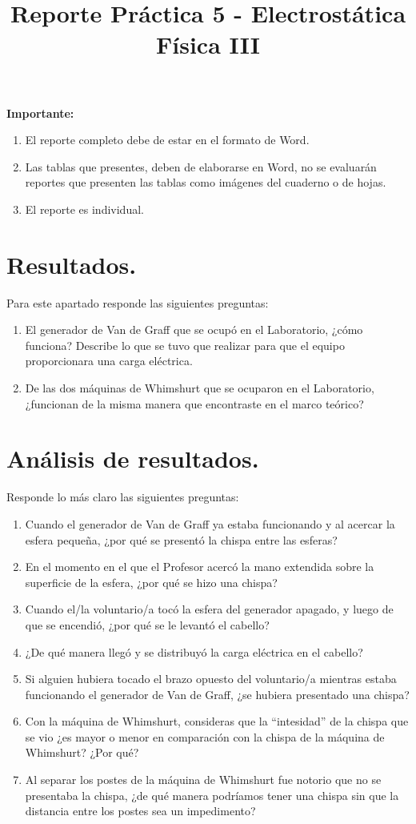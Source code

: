 \documentclass[14pt]{extarticle}
\title{\vspace*{-2cm} Reporte Práctica 5 - Electrostática \\  Física III\vspace{-5ex}}
\date{}
\begin{document}
\maketitle

\textbf{Importante:}
\begin{enumerate}
\item El reporte completo debe de estar en el formato de Word.
\item Las tablas que presentes, deben de elaborarse en Word, no se evaluarán reportes que presenten las tablas como imágenes del cuaderno o de hojas.
\item El reporte es individual.
\end{enumerate}

\section{Resultados.}

Para este apartado responde las siguientes preguntas:
\begin{enumerate}[label=\roman*)]
\item El generador de Van de Graff que se ocupó en el Laboratorio, ¿cómo funciona? Describe lo que se tuvo que realizar para que el equipo proporcionara una carga eléctrica.
\item De las dos máquinas de Whimshurt que se ocuparon en el Laboratorio, ¿funcionan de la misma manera que encontraste en el marco teórico?
\end{enumerate}

\section{Análisis de resultados.}

Responde lo más claro las siguientes preguntas:
\begin{enumerate}[label=\alph*)]
\item Cuando el generador de Van de Graff ya estaba funcionando y al acercar la esfera pequeña, ¿por qué se presentó la chispa entre las esferas?
\item En el momento en el que el Profesor acercó la mano extendida sobre la superficie de la esfera, ¿por qué se hizo una chispa?
\item Cuando el/la voluntario/a tocó la esfera del generador apagado, y luego de que se encendió, ¿por qué se le levantó el cabello?
\item ¿De qué manera llegó y se distribuyó la carga eléctrica en el cabello?
\item Si alguien hubiera tocado el brazo opuesto del voluntario/a mientras estaba funcionando el generador de Van de Graff, ¿se hubiera presentado una chispa?
\item Con la máquina de Whimshurt, consideras que la \enquote{intesidad} de la chispa que se vio ¿es mayor o menor en comparación con la chispa de la máquina de Whimshurt? ¿Por qué?
\item Al separar los postes de la máquina de Whimshurt fue notorio que no se presentaba la chispa, ¿de qué manera podríamos tener una chispa sin que la distancia entre los postes sea un impedimento?
\end{enumerate}
\end{document}

